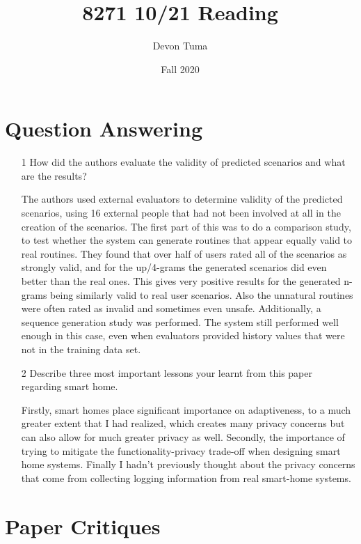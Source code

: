 \documentclass[11pt]{article}
\title{8271 10/21 Reading}
\author{Devon Tuma}
\date{Fall 2020}
\begin{document}
\maketitle

\section*{Question Answering}

\begin{itemize}
\item [1] How did the authors evaluate the validity of predicted scenarios and what are the results?

  The authors used external evaluators to determine validity of the predicted scenarios, using 16 external people that had not been involved at all in the creation of the scenarios.
  The first part of this was to do a comparison study, to test whether the system can generate routines that appear equally valid to real routines.
  They found that over half of users rated all of the scenarios as strongly valid, and for the up/4-grams the generated scenarios did even better than the real ones.
  This gives very positive results for the generated n-grams being similarly valid to real user scenarios.
  Also the unnatural routines were often rated as invalid and sometimes even unsafe.
  Additionally, a sequence generation study was performed.
  The system still performed well enough in this case, even when evaluators provided history values that were not in the training data set.
  
\item [2] Describe three most important lessons your learnt from this paper regarding smart home.

  Firstly, smart homes place significant importance on adaptiveness, to a much greater extent that I had realized, which creates many privacy concerns but can also allow for much greater privacy as well.
  Secondly, the importance of trying to mitigate the functionality-privacy trade-off when designing smart home systems.
  Finally I hadn't previously thought about the privacy concerns that come from collecting logging information from real smart-home systems.

  
\end{itemize}

\section*{Paper Critiques}
\end{document}
